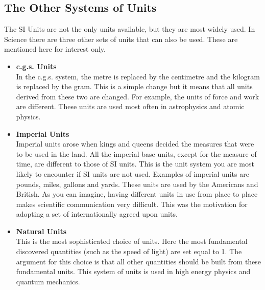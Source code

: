  \subsection*{The Other Systems of Units}
            \nopagebreak
The SI Units are not the only units available, but they are most widely used. In Science there are three other sets of units that can also be used. These are mentioned here for interest only.
\begin{itemize}
 \item \textbf{c.g.s. Units} \\
In the c.g.s.\@{} system, the metre is replaced by the centimetre and the kilogram is replaced by the gram. This is a simple change but it means that all units derived from these two are changed. For example, the units of force and work are different. These units are used most often in astrophysics and atomic physics.
\item \textbf{Imperial Units} \\
Imperial units arose when kings and queens decided the measures that were to be used in the land. All the imperial base units, except for the measure of time, are different to those of SI units. This is the unit system you are most likely to encounter if SI units are not used. Examples of imperial units are pounds, miles, gallons and yards. These units are used by the Americans and British. As you can imagine, having different units in use from place to place makes scientific communication very difficult. This was the motivation for adopting a set of internationally agreed upon units.
\item \textbf{Natural Units} \\
This is the most sophisticated choice of units. Here the most fundamental discovered quantities (such as the speed of light) are set equal to 1. The argument for this choice is that all other quantities should be built from these fundamental units. This system of units is used in high energy physics and quantum mechanics.
\end{itemize}
